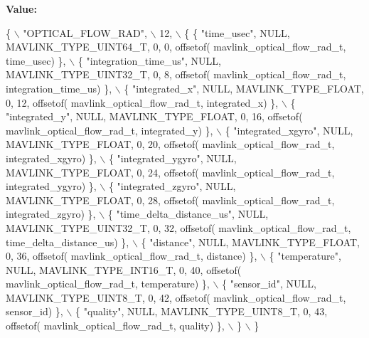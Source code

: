 {\bfseries Value\+:}
\begin{DoxyCode}
\{ \(\backslash\)
    \textcolor{stringliteral}{"OPTICAL\_FLOW\_RAD"}, \(\backslash\)
    12, \(\backslash\)
    \{  \{ \textcolor{stringliteral}{"time\_usec"}, NULL, MAVLINK_TYPE_UINT64_T, 0, 0, offsetof(
      mavlink_optical_flow_rad_t, time\_usec) \}, \(\backslash\)
         \{ \textcolor{stringliteral}{"integration\_time\_us"}, NULL, MAVLINK_TYPE_UINT32_T, 0, 8, offsetof(
      mavlink_optical_flow_rad_t, integration\_time\_us) \}, \(\backslash\)
         \{ \textcolor{stringliteral}{"integrated\_x"}, NULL, MAVLINK_TYPE_FLOAT, 0, 12, offsetof(
      mavlink_optical_flow_rad_t, integrated\_x) \}, \(\backslash\)
         \{ \textcolor{stringliteral}{"integrated\_y"}, NULL, MAVLINK_TYPE_FLOAT, 0, 16, offsetof(
      mavlink_optical_flow_rad_t, integrated\_y) \}, \(\backslash\)
         \{ \textcolor{stringliteral}{"integrated\_xgyro"}, NULL, MAVLINK_TYPE_FLOAT, 0, 20, offsetof(
      mavlink_optical_flow_rad_t, integrated\_xgyro) \}, \(\backslash\)
         \{ \textcolor{stringliteral}{"integrated\_ygyro"}, NULL, MAVLINK_TYPE_FLOAT, 0, 24, offsetof(
      mavlink_optical_flow_rad_t, integrated\_ygyro) \}, \(\backslash\)
         \{ \textcolor{stringliteral}{"integrated\_zgyro"}, NULL, MAVLINK_TYPE_FLOAT, 0, 28, offsetof(
      mavlink_optical_flow_rad_t, integrated\_zgyro) \}, \(\backslash\)
         \{ \textcolor{stringliteral}{"time\_delta\_distance\_us"}, NULL, MAVLINK_TYPE_UINT32_T, 0, 32, offsetof(
      mavlink_optical_flow_rad_t, time\_delta\_distance\_us) \}, \(\backslash\)
         \{ \textcolor{stringliteral}{"distance"}, NULL, MAVLINK_TYPE_FLOAT, 0, 36, offsetof(
      mavlink_optical_flow_rad_t, distance) \}, \(\backslash\)
         \{ \textcolor{stringliteral}{"temperature"}, NULL, MAVLINK_TYPE_INT16_T, 0, 40, offsetof(
      mavlink_optical_flow_rad_t, temperature) \}, \(\backslash\)
         \{ \textcolor{stringliteral}{"sensor\_id"}, NULL, MAVLINK_TYPE_UINT8_T, 0, 42, offsetof(
      mavlink_optical_flow_rad_t, sensor\_id) \}, \(\backslash\)
         \{ \textcolor{stringliteral}{"quality"}, NULL, MAVLINK_TYPE_UINT8_T, 0, 43, offsetof(
      mavlink_optical_flow_rad_t, quality) \}, \(\backslash\)
         \} \(\backslash\)
\}
\end{DoxyCode}
\mbox{\label{mavlink__msg__optical__flow__rad_8h_ae4ea5fb754959296ea19e5998e5d9239}} 
